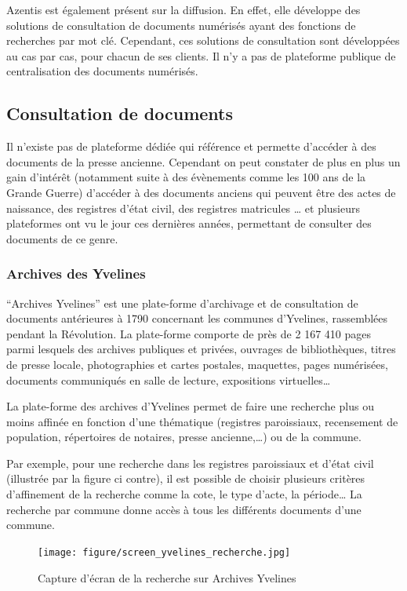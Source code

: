         Azentis est également présent sur la diffusion. En effet, elle développe des solutions de consultation de documents numérisés ayant des fonctions de recherches par mot clé. Cependant, ces solutions de consultation sont développées au cas par cas, pour chacun de ses clients. Il n'y a pas de plateforme publique de centralisation des documents numérisés.

    \subsection{Consultation de documents}
    \label{subsec:consultation}
    Il n’existe pas de plateforme dédiée qui référence et permette d’accéder à des documents de la presse ancienne. Cependant on peut constater de plus en plus un gain d’intérêt (notamment suite à des évènements comme les 100 ans de la Grande Guerre) d’accéder à des documents anciens qui peuvent être des actes de naissance, des registres d’état civil, des registres matricules … et plusieurs plateformes ont vu le jour ces dernières années, permettant de consulter des documents de ce genre.


        \subsubsection{Archives des Yvelines}
        \label{subsubsec:yvelines}
        “Archives Yvelines” est une plate-forme d’archivage et de consultation de documents antérieures à 1790 concernant les communes d’Yvelines, rassemblées pendant la Révolution. La plate-forme comporte de près de 2 167 410 pages parmi lesquels  des archives publiques et privées, ouvrages de bibliothèques, titres de presse locale, photographies et cartes postales, maquettes, pages numérisées, documents communiqués en salle de lecture, expositions virtuelles…

        La plate-forme des archives d’Yvelines permet de faire une recherche plus ou moins affinée en fonction d’une thématique (registres paroissiaux, recensement de population, répertoires de notaires, presse ancienne,…) ou de la commune. 

        Par exemple, pour une recherche dans les registres paroissiaux et d’état civil (illustrée par la figure ci contre), il est possible de choisir plusieurs critères d’affinement de la recherche comme la cote, le type d’acte, la période… La recherche par commune donne accès à tous les différents documents d’une commune.

        \begin{figure}[ht!]
            \centering
            \texttt{[image: figure/screen\_yvelines\_recherche.jpg]}
            \caption{Capture d'écran de la recherche sur Archives Yvelines}
            \label{fig:gallica}
        \end{figure}

